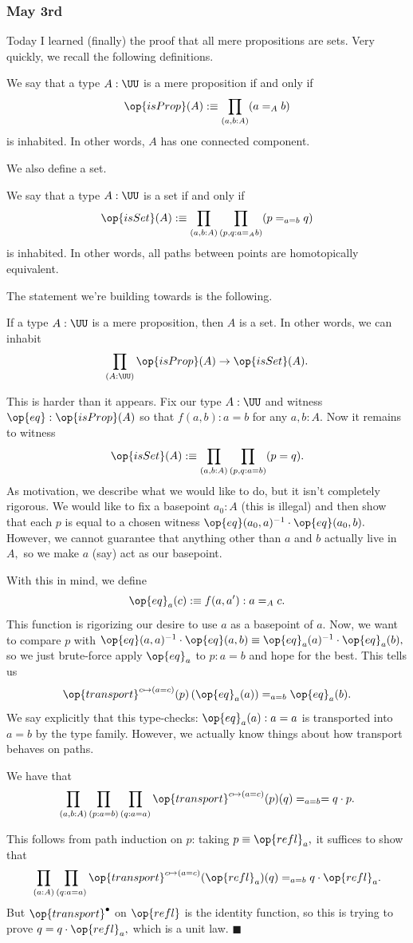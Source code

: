 \subsubsection{May 3rd}
Today I learned (finally) the proof that all mere propositions are sets. Very quickly, we recall the following definitions.
\begin{definition}
    We say that a type $A:\UU$ is a mere proposition if and only if
    \[\op{isProp}(A):\equiv\prod_{(a,b:A)}(a=_Ab)\]
    is inhabited. In other words, $A$ has one connected component.
\end{definition}
We also define a set.
\begin{definition}
    We say that a type $A:\UU$ is a set if and only if
    \[\op{isSet}(A):\equiv\prod_{(a,b:A)}\prod_{(p,q:a=_Ab)}(p=_{a=b}q)\]
    is inhabited. In other words, all paths between points are homotopically equivalent.
\end{definition}
The statement we're building towards is the following.
\begin{proposition}
    If a type $A:\UU$ is a mere proposition, then $A$ is a set. In other words, we can inhabit
    \[\prod_{(A:\UU)}\op{isProp}(A)\to\op{isSet}(A).\]
\end{proposition}
This is harder than it appears. Fix our type $A:\UU$ and witness $\op{eq}:\op{isProp}(A)$ so that $f(a,b):a=b$ for any $a,b:A.$ Now it remains to witness
\[\op{isSet}(A):\equiv\prod_{(a,b:A)}\prod_{(p,q:a=b)}(p=q).\]
As motivation, we describe what we would like to do, but it isn't completely rigorous. We would like to fix a basepoint $a_0:A$ (this is illegal) and then show that each $p$ is equal to a chosen witness $\op{eq}(a_0,a)^{-1}\cdot\op{eq}(a_0,b).$ However, we cannot guarantee that anything other than $a$ and $b$ actually live in $A,$ so we make $a$ (say) act as our basepoint.

With this in mind, we define
\[\op{eq}_a(c):\equiv f(a,a'):a=_Ac.\]
This function is rigorizing our desire to use $a$ as a basepoint of $a.$ Now, we want to compare $p$ with $\op{eq}(a,a)^{-1}\cdot\op{eq}(a,b)\equiv\op{eq}_a(a)^{-1}\cdot\op{eq}_a(b),$ so we just brute-force apply $\op{eq}_a$ to $p:a=b$ and hope for the best. This tells us
\[\op{transport}^{c\mapsto(a=c)}(p)\left(\op{eq}_a(a)\right)=_{a=b}\op{eq}_a(b).\]
We say explicitly that this type-checks: $\op{eq}_a(a):a=a$ is transported into $a=b$ by the type family. However, we actually know things about how transport behaves on paths.
\begin{lemma}
    We have that
    \[\prod_{(a,b:A)}\prod_{(p:a=b)}\prod_{(q:a=a)}\op{transport}^{c\mapsto(a=c)}(p)(q)=_{a=b}=q\cdot p.\]
\end{lemma}
This follows from path induction on $p$: taking $p\equiv\op{refl}_a,$ it suffices to show that
\[\prod_{(a:A)}\prod_{(q:a=a)}\op{transport}^{c\mapsto(a=c)}(\op{refl}_a)(q)=_{a=b}q\cdot\op{refl}_a.\]
But $\op{transport}^\bullet$ on $\op{refl}$ is the identity function, so this is trying to prove $q=q\cdot\op{refl}_a,$ which is a unit law. $\blacksquare$

